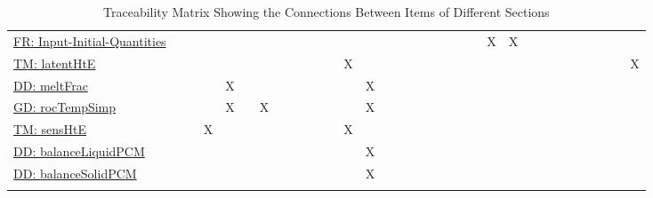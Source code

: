 \documentclass[12pt]{article}
\begin{document}
\begin{longtable}{l l l l l l l l l l l l l l l l l l l l l l l l l l l l l l l l l}
\hyperref[inputInitQuants]{FR: Input-Initial-Quantities} &  &  &  &  &  &  &  &  &  &  &  &  &  &  &  &  &  &  &  &  &  & X & X &  &  &  &  &  &  &  &  & 
\\
\hyperref[TM:latentHtE]{TM: latentHtE} &  &  &  &  &  &  &  &  &  &  &  & X &  &  &  &  &  &  &  &  &  &  &  &  &  &  &  &  &  &  &  & X
\\
\hyperref[DD:meltFrac]{DD: meltFrac} &  &  &  & X &  &  &  &  &  &  &  &  & X &  &  &  &  &  &  &  &  &  &  &  &  &  &  &  &  &  &  & 
\\
\hyperref[GD:rocTempSimp]{GD: rocTempSimp} &  &  &  & X &  & X &  &  &  &  &  &  & X &  &  &  &  &  &  &  &  &  &  &  &  &  &  &  &  &  &  & 
\\
\hyperref[TM:sensHtE]{TM: sensHtE} &  &  & X &  &  &  &  &  &  &  &  & X &  &  &  &  &  &  &  &  &  &  &  &  &  &  &  &  &  &  &  & 
\\
\hyperref[DD:balanceLiquidPCM]{DD: balanceLiquidPCM} &  &  &  &  &  &  &  &  &  &  &  &  & X &  &  &  &  &  &  &  &  &  &  &  &  &  &  &  &  &  &  & 
\\
\hyperref[DD:balanceSolidPCM]{DD: balanceSolidPCM} &  &  &  &  &  &  &  &  &  &  &  &  & X &  &  &  &  &  &  &  &  &  &  &  &  &  &  &  &  &  &  & 
\\
\bottomrule
\caption{Traceability Matrix Showing the Connections Between Items of Different Sections}
\label{Table:Tracey}
\end{longtable}
\end{document}
